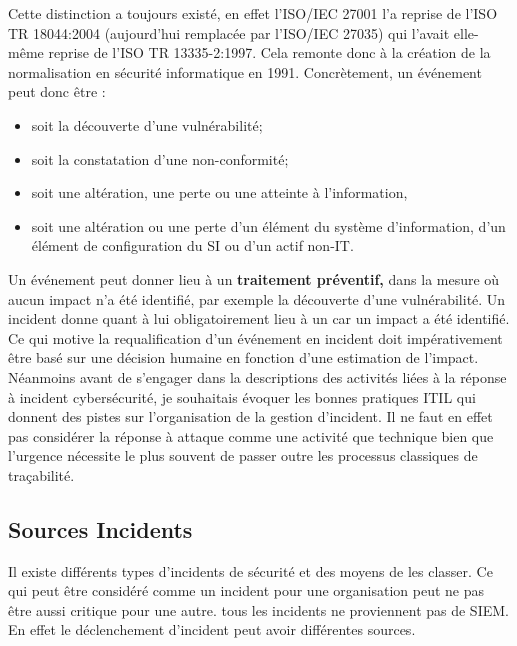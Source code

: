 Cette distinction a toujours existé, en effet l'ISO/IEC 27001 l'a reprise de l'ISO TR 18044:2004 (aujourd'hui remplacée par l'ISO/IEC 27035) qui l'avait elle-même reprise de l'ISO TR 13335-2:1997. Cela remonte donc à la création de la normalisation en sécurité informatique en 1991.
Concrètement, un événement peut donc être :
\begin{itemize}
  \item soit la découverte d’une vulnérabilité;
  \item  soit la constatation d’une non-conformité;
  \item soit une altération, une perte ou une atteinte à l’information,
  \item   soit une altération ou une perte d’un élément du système d’information, d’un élément de configuration du SI ou d’un actif non-IT.
\end{itemize}

Un événement peut donner lieu à un \textbf{traitement préventif,} dans la mesure où aucun impact n'a été identifié, par exemple la découverte d’une vulnérabilité.
Un incident donne quant à lui obligatoirement lieu à un car un impact a été identifié.
Ce qui motive la requalification d’un événement en incident doit impérativement être basé sur une décision humaine en fonction d'une estimation de l'impact.
Néanmoins avant de s'engager dans la descriptions des activités liées à la réponse à incident cybersécurité, je souhaitais évoquer les bonnes pratiques ITIL qui donnent des pistes sur l'organisation de la gestion d'incident. Il ne faut en effet pas considérer la réponse à attaque comme une activité que technique bien que l'urgence nécessite le plus souvent de passer outre les processus classiques de traçabilité.

\subsection{Sources Incidents}

Il existe différents types d'incidents de sécurité et des moyens de les classer. Ce qui peut être considéré comme un incident pour une organisation peut ne pas être aussi critique pour une autre. tous les incidents ne proviennent pas de SIEM. En effet le déclenchement d'incident peut avoir différentes sources.


